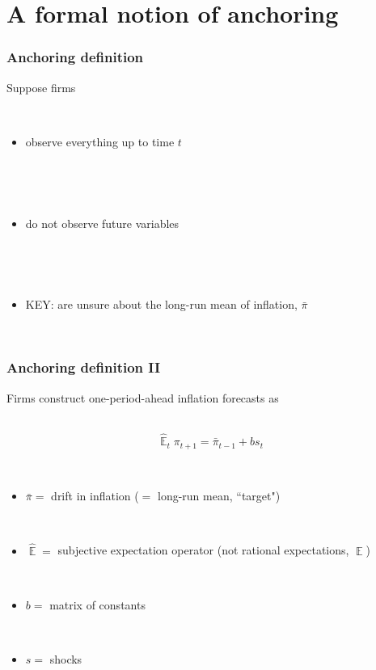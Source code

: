 \documentclass{beamer}
\DeclareMathOperator{\E}{\mathbb{E}}
\begin{document}
\section{A formal notion of anchoring}
\begin{frame}
	\frametitle{Anchoring definition}
Suppose firms

\

\begin{itemize}
\item observe everything up to time $t$ 

\

\

\item do not observe future variables

\

\

\item KEY: are unsure about the long-run mean of inflation, $\bar{\pi}$
\end{itemize}


\



\end{frame}

\begin{frame}
	\frametitle{Anchoring definition II}

Firms construct one-period-ahead inflation forecasts as

\
\color{red}{CHECK}
\begin{equation}
\hat{\E}_t\pi_{t+1} =  \bar{\pi}_{t-1}+bs_{t}
\end{equation}

\

\begin{itemize}
\item[] $\bar{\pi} =$ drift in inflation ($=$ long-run mean, ``target")

\



\item[] $\hat{\E} =$ subjective expectation operator (not rational expectations, $\E$)

\



\item[] $b =$ matrix of constants 

\

\item[] $s =$ shocks
\end{itemize}

\



\end{frame}
\end{document}
